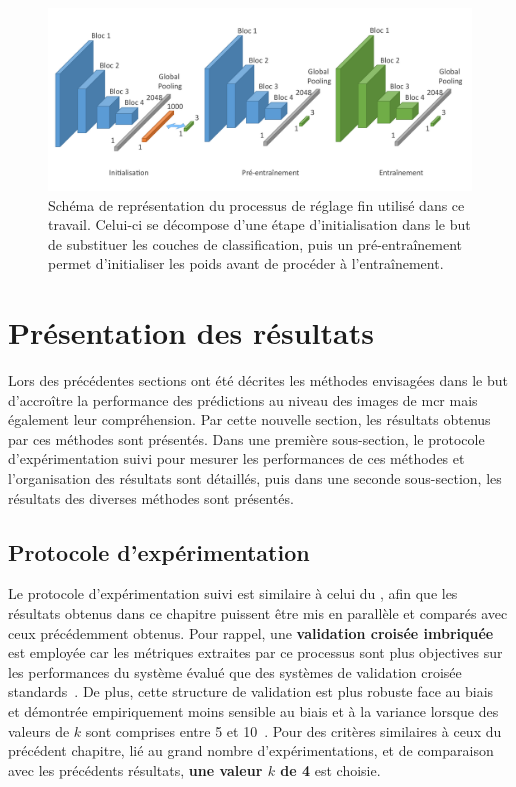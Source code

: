 \begin{figure}[H]
    \centering
    \includegraphics[width=\linewidth]{contents/chapter_6/resources/scheme_image_improvement_image_fine_tune.pdf}
    \caption{Schéma de représentation du processus de réglage fin utilisé dans ce travail. Celui-ci se décompose d'une étape d'initialisation dans le but de substituer les couches de classification, puis un pré-entraînement permet d'initialiser les poids avant de procéder à l'entraînement.}
    \label{fig:scheme_image_fine_tune}
\end{figure}\par
\clearpage

\section{Présentation des résultats}
Lors des précédentes sections ont été décrites les méthodes envisagées dans le but d'accroître la performance des prédictions au niveau des images de \gls{mcr} mais également leur compréhension. Par cette nouvelle section, les résultats obtenus par ces méthodes sont présentés. Dans une première sous-section, le protocole d'expérimentation suivi pour mesurer les performances de ces méthodes et l'organisation des résultats sont détaillés, puis dans une seconde sous-section, les résultats des diverses méthodes sont présentés.\par

\subsection{Protocole d'expérimentation}
Le protocole d'expérimentation suivi est similaire à celui du , afin que les résultats obtenus dans ce chapitre puissent être mis en parallèle et comparés avec ceux précédemment obtenus. Pour rappel, une \textbf{validation croisée imbriquée} est employée car les métriques extraites par ce processus sont plus objectives sur les performances du système évalué que des systèmes de validation croisée standards~\cite{Cawley2010}. De plus, cette structure de validation est plus robuste face au biais~\cite{Cawley2010} et démontrée empiriquement moins sensible au biais et à la variance lorsque des valeurs de $k$ sont comprises entre 5 et 10~\cite{James2013}. Pour des critères similaires à ceux du précédent chapitre, lié au grand nombre d'expérimentations, et de comparaison avec les précédents résultats, \textbf{une valeur $k$ de 4} est choisie.\par

